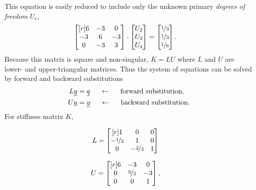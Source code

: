 This equation is easily reduced to include only the unknown primary \emph{degrees of freedom} $U_e$,
\begin{align*}
  \begin{bmatrix}[r]
     6 & -3 &  0 \\
    -3 &  6 & -3 \\
     0 & -3 &  3 \\
  \end{bmatrix} \cdot
  \begin{bmatrix} U_2 \\ U_3 \\ U_4 \end{bmatrix} &=
  \begin{bmatrix} \nicefrac{1}{3} \\ \nicefrac{1}{3} \\ \nicefrac{1}{6} \end{bmatrix}.
\end{align*}
Because this matrix is square and non-singular, $K = LU$ where $L$ and $U$ are lower- and upper-triangular matrices.  Thus the system of equations can be solved by forward and backward substitutions \citep{watkins_2010}
\begin{align*}
  L\underline{y} &= \underline{q} \hspace{5mm} \leftarrow \hspace{5mm} \text{forward substitution}, \\
  U\underline{u} &= \underline{y} \hspace{5mm} \leftarrow \hspace{5mm} \text{backward substitution.}
\end{align*}
For stiffness matrix $K$,
\begin{multicols}{2}
\begin{align*}
  L &= 
  \begin{bmatrix}[r]
     1               &  0               &  0 \\
    -\nicefrac{1}{2} &  1               &  0 \\
     0               & -\nicefrac{2}{3} &  1
  \end{bmatrix}
\end{align*}

\begin{align*}
  U &=
  \begin{bmatrix}[r]
     6 & -3               &  0 \\
     0 &  \nicefrac{9}{2} & -3 \\
     0 &  0               &  1
  \end{bmatrix},
\end{align*}
\end{multicols}
